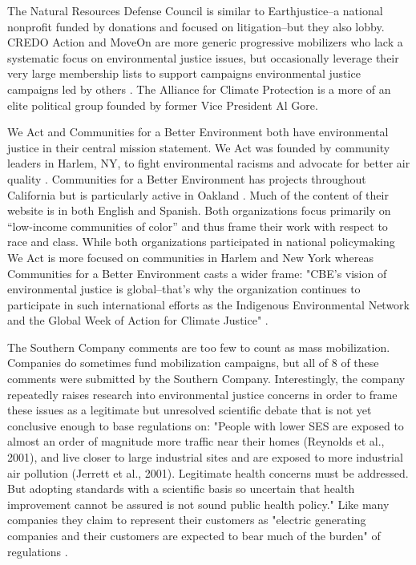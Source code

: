  The Natural Resources Defense Council is similar to Earthjustice--a national nonprofit funded by donations and focused on litigation--but they also lobby. CREDO Action and MoveOn are more generic progressive mobilizers who lack a systematic focus on environmental justice issues, but occasionally leverage their very large membership lists to support campaigns environmental justice campaigns led by others \citep{MoveOn.org2017, CREDO2017}. The Alliance for Climate Protection is a more of an elite political group founded by former Vice President Al Gore. 
 
 We Act and Communities for a Better Environment both have environmental justice in their central mission statement. We Act was founded by community leaders in Harlem, NY, to fight environmental racisms and advocate for better air quality \citep{WEACT2017}. Communities for a Better Environment has projects throughout California but is particularly active in Oakland \citep{CBECAL2017CommunitiesEnvironment}. Much of the content of their website is in both English and Spanish. Both organizations focus primarily on ``low-income communities of color'' and thus frame their work with respect to race and class. While both organizations participated in national policymaking We Act is more focused on communities in Harlem and New York whereas Communities for a Better Environment casts a wider frame: "CBE’s vision of environmental justice is global--that’s why the organization continues to participate in such international efforts as the Indigenous Environmental Network and the Global Week of Action for Climate Justice" \citep{CBECAL2017}.
 
 The Southern Company comments are too few to count as mass mobilization. Companies do sometimes fund mobilization campaigns, but all of 8 of these comments were submitted by the Southern Company. Interestingly, the company repeatedly raises research into environmental justice concerns in order to frame these issues as a legitimate but unresolved scientific debate that is not yet conclusive enough to base regulations on: "People with lower SES are exposed to almost an order of magnitude more traffic near their homes (Reynolds et al., 2001), and live closer to large industrial sites and are exposed to more industrial air pollution (Jerrett et al., 2001). Legitimate health concerns must be addressed. But adopting standards with a scientific basis so uncertain that health improvement cannot be assured is not sound public health policy." Like many companies they claim to represent their customers as "electric generating companies and their customers are expected to bear much of the burden" of regulations \citep{Hobson2004}.
 

